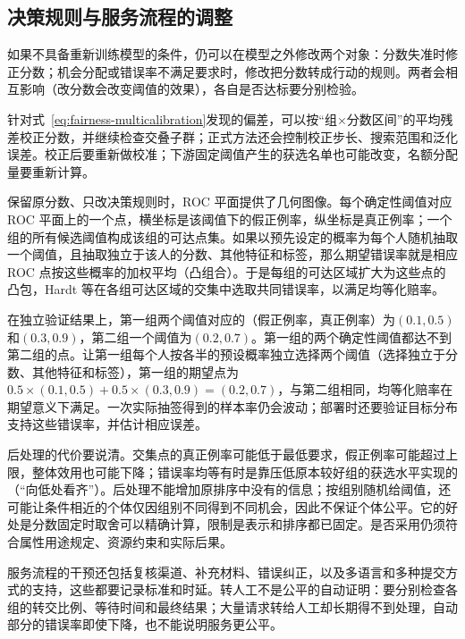 \subsection{决策规则与服务流程的调整}
\label{sec:fairness-decision-intervention}

如果不具备重新训练模型的条件，仍可以在模型之外修改两个对象：分数失准时修正分数；机会分配或错误率不满足要求时，修改把分数转成行动的规则。两者会相互影响（改分数会改变阈值的效果），各自是否达标要分别检验。

针对式~\eqref{eq:fairness-multicalibration}发现的偏差，可以按“组×分数区间”的平均残差校正分数，并继续检查交叠子群；正式方法还会控制校正步长、搜索范围和泛化误差。校正后要重新做校准；下游固定阈值产生的获选名单也可能改变，名额分配量要重新计算。

保留原分数、只改决策规则时，ROC 平面提供了几何图像。每个确定性阈值对应 ROC 平面上的一个点，横坐标是该阈值下的假正例率，纵坐标是真正例率；一个组的所有候选阈值构成该组的可达点集。如果以预先设定的概率为每个人随机抽取一个阈值，且抽取独立于该人的分数、其他特征和标签，那么期望错误率就是相应 ROC 点按这些概率的加权平均（凸组合）。于是每组的可达区域扩大为这些点的凸包，Hardt 等在各组可达区域的交集中选取共同错误率，以满足均等化赔率。

\begin{example}[随机化如何补出共同错误率]
\label{ex:fairness-random-threshold}
在独立验证结果上，第一组两个阈值对应的（假正例率，真正例率）为$(0.1,0.5)$和$(0.3,0.9)$，第二组一个阈值为$(0.2,0.7)$。第一组的两个确定性阈值都达不到第二组的点。让第一组每个人按各半的预设概率独立选择两个阈值（选择独立于分数、其他特征和标签），第一组的期望点为$0.5\times(0.1,0.5)+0.5\times(0.3,0.9)=(0.2,0.7)$，与第二组相同，均等化赔率在期望意义下满足。一次实际抽签得到的样本率仍会波动；部署时还要验证目标分布支持这些错误率，并估计相应误差。
\end{example}

后处理的代价要说清。交集点的真正例率可能低于最低要求，假正例率可能超过上限，整体效用也可能下降；错误率均等有时是靠压低原本较好组的获选水平实现的（“向低处看齐”）。后处理不能增加原排序中没有的信息；按组别随机给阈值，还可能让条件相近的个体仅因组别不同得到不同机会，因此不保证个体公平。它的好处是分数固定时取舍可以精确计算，限制是表示和排序都已固定。是否采用仍须符合属性用途规定、资源约束和实际后果。

服务流程的干预还包括复核渠道、补充材料、错误纠正，以及多语言和多种提交方式的支持，这些都要记录标准和时延。转人工不是公平的自动证明：要分别检查各组的转交比例、等待时间和最终结果；大量请求转给人工却长期得不到处理，自动部分的错误率即使下降，也不能说明服务更公平。

